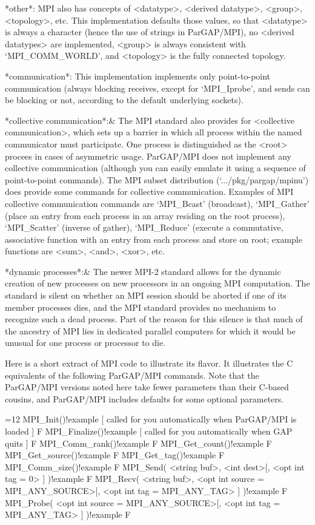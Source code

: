 *other*: MPI also has concepts of <datatype>, <derived datatype>,
<group>, <topology>, etc.  This implementation defaults those values,
so that <datatype> is always a character (hence the use of strings in
ParGAP/MPI), no <derived datatypes> are implemented, <group> is always
consistent with `MPI_COMM_WORLD', and <topology> is the fully
connected topology.

*communication*:  This implementation implements only point-to-point
communication (always blocking receives, except for `MPI_Iprobe', and
sends can be blocking or not, according to the default underlying
sockets).

*collective communication*:& The MPI standard also provides for
<collective communication>, which sets up a barrier in which all
process within the named communicator must participate.  One process
is distinguished as the <root> procees in cases of asymmetric usage.
ParGAP/MPI does not implement any collective communication (although
you can easily emulate it using a sequence of point-to-point
commands).  The MPI subset distribution (`.../pkg/pargap/mpinu')
does provide some commands for collective communication.  Examples of
MPI collective communication commands are `MPI_Bcast' (broadcast),
`MPI_Gather' (place an entry from each process in an array residing on
the root process), `MPI_Scatter' (inverse of gather), `MPI_Reduce'
(execute a commutative, associative function with an entry from each
process and store on root; example functions are <sum>, <and>, <xor>,
etc.

*dynamic processes*:& The newer MPI-2 standard allows for the dynamic
creation of new processes on new processors in an ongoing MPI
computation.  The standard is silent on whether an MPI session should
be aborted if one of its member processes dies, and the MPI standard
provides no mechanism to recognize such a dead process.  Part of the
reason for this silence is that much of the ancestry of MPI lies in
dedicated parallel computers for which it would be unusual for one process
or processor to die.
\enditems

Here is a short extract of MPI code to illustrate its flavor.  It
illustrates the C equivalents of the following ParGAP/MPI commands.
Note that the ParGAP/MPI versions noted here take fewer parameters
than their C-based cousins, and ParGAP/MPI includes defaults for some
optional parameters.

{=12
\>MPI_Init()!{example} %
              [ called for you automatically when ParGAP/MPI is loaded ] F
\>MPI_Finalize()!{example} [ called for you automatically when GAP quits ] F
\>MPI_Comm_rank()!{example} F
\>MPI_Get_count()!{example} F
\>MPI_Get_source()!{example} F
\>MPI_Get_tag()!{example} F
\>MPI_Comm_size()!{example} F
\>MPI_Send( <string buf>, <int dest>[, <opt int tag = 0> ] )!{example} F
\>MPI_Recv( <string buf>, <opt int source = MPI_ANY_SOURCE>[, %
            <opt int tag = MPI_ANY_TAG> ] )!{example} F
\>MPI_Probe( <opt int source = MPI_ANY_SOURCE>[, %
             <opt int tag = MPI_ANY_TAG> ] )!{example} F
\par}

